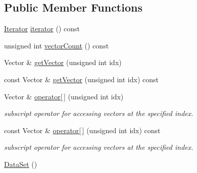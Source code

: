 \subsection*{Public Member Functions}
\begin{DoxyCompactItemize}
\item 
\hyperlink{class_lots_of_lines_1_1_data_set_1_1_iterator}{Iterator} \hyperlink{class_lots_of_lines_1_1_data_set_a10b7e2e1319d223c6365c5acec9a3f3a}{iterator} () const 
\item 
unsigned int \hyperlink{class_lots_of_lines_1_1_data_set_a014a459b9e76b953e541f4d528fc7cdb}{vector\+Count} () const 
\item 
Vector \& \hyperlink{class_lots_of_lines_1_1_data_set_a65f1a6baa7516118f6fb21f0329ab053}{get\+Vector} (unsigned int idx)
\item 
const Vector \& \hyperlink{class_lots_of_lines_1_1_data_set_a2f748da99b96d226d5d4e8903da5db10}{get\+Vector} (unsigned int idx) const 
\item 
Vector \& \hyperlink{class_lots_of_lines_1_1_data_set_ad15f040e5048686fb2e28c3e2a38775c}{operator\mbox{[}$\,$\mbox{]}} (unsigned int idx)\hypertarget{class_lots_of_lines_1_1_data_set_ad15f040e5048686fb2e28c3e2a38775c}{}\label{class_lots_of_lines_1_1_data_set_ad15f040e5048686fb2e28c3e2a38775c}

\begin{DoxyCompactList}\small\item\em subscript operator for accessing vectors at the specified index. \end{DoxyCompactList}\item 
const Vector \& \hyperlink{class_lots_of_lines_1_1_data_set_aec5ed23bf96864526ff4a62f94767ce5}{operator\mbox{[}$\,$\mbox{]}} (unsigned int idx) const \hypertarget{class_lots_of_lines_1_1_data_set_aec5ed23bf96864526ff4a62f94767ce5}{}\label{class_lots_of_lines_1_1_data_set_aec5ed23bf96864526ff4a62f94767ce5}

\begin{DoxyCompactList}\small\item\em subscript operator for accessing vectors at the specified index. \end{DoxyCompactList}\item 
\hyperlink{class_lots_of_lines_1_1_data_set_ac9b99505bafd5b1cccf8a361c3ac84a7}{Data\+Set} ()\hypertarget{class_lots_of_lines_1_1_data_set_ac9b99505bafd5b1cccf8a361c3ac84a7}{}\label{class_lots_of_lines_1_1_data_set_ac9b99505bafd5b1cccf8a361c3ac84a7}


\end{DoxyCompactItemize}
